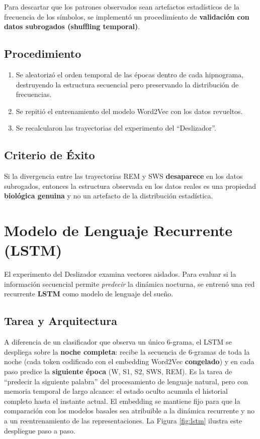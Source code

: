 Para descartar que los patrones observados sean artefactos estadísticos de la frecuencia de los símbolos, se implementó un procedimiento de \textbf{validación con datos subrogados (shuffling temporal)}.

\subsection{Procedimiento}

\begin{enumerate}
    \item Se aleatorizó el orden temporal de las épocas dentro de cada hipnograma, destruyendo la estructura secuencial pero preservando la distribución de frecuencias.
    \item Se repitió el entrenamiento del modelo Word2Vec con los datos revueltos.
    \item Se recalcularon las trayectorias del experimento del ``Deslizador''.
\end{enumerate}

\subsection{Criterio de Éxito}

Si la divergencia entre las trayectorias REM y SWS \textbf{desaparece} en los datos subrogados, entonces la estructura observada en los datos reales es una propiedad \textbf{biológica genuina} y no un artefacto de la distribución estadística.

\section{Modelo de Lenguaje Recurrente (LSTM)}

El experimento del Deslizador examina vectores aislados. Para evaluar si la información secuencial permite \textit{predecir} la dinámica nocturna, se entrenó una red recurrente \textbf{LSTM} como modelo de lenguaje del sueño.

\subsection{Tarea y Arquitectura}

A diferencia de un clasificador que observa un único 6-grama, el LSTM se despliega sobre la \textbf{noche completa}: recibe la secuencia de 6-gramas de toda la noche (cada token codificado con el embedding Word2Vec \textbf{congelado}) y en cada paso predice la \textbf{siguiente época} (W, S1, S2, SWS, REM). Es la tarea de ``predecir la siguiente palabra'' del procesamiento de lenguaje natural, pero con memoria temporal de largo alcance: el estado oculto acumula el historial completo hasta el instante actual. El embedding se mantiene fijo para que la comparación con los modelos basales sea atribuible a la dinámica recurrente y no a un reentrenamiento de las representaciones. La Figura \ref{fig:lstm} ilustra este despliegue paso a paso.

